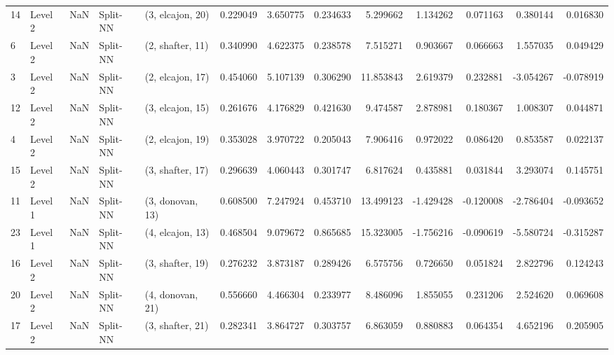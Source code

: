 \begin{tabular}{llrllrrrrrrrr}
14 &   Level 2 &    NaN &       Split-NN &  (3, elcajon, 20) &   0.229049 &   3.650775 &  0.234633 &   5.299662 &             1.134262 &               0.071163 &            0.380144 &              0.016830 \\
6  &   Level 2 &    NaN &       Split-NN &  (2, shafter, 11) &   0.340990 &   4.622375 &  0.238578 &   7.515271 &             0.903667 &               0.066663 &            1.557035 &              0.049429 \\
3  &   Level 2 &    NaN &       Split-NN &  (2, elcajon, 17) &   0.454060 &   5.107139 &  0.306290 &  11.853843 &             2.619379 &               0.232881 &           -3.054267 &             -0.078919 \\
12 &   Level 2 &    NaN &       Split-NN &  (3, elcajon, 15) &   0.261676 &   4.176829 &  0.421630 &   9.474587 &             2.878981 &               0.180367 &            1.008307 &              0.044871 \\
4  &   Level 2 &    NaN &       Split-NN &  (2, elcajon, 19) &   0.353028 &   3.970722 &  0.205043 &   7.906416 &             0.972022 &               0.086420 &            0.853587 &              0.022137 \\
15 &   Level 2 &    NaN &       Split-NN &  (3, shafter, 17) &   0.296639 &   4.060443 &  0.301747 &   6.817624 &             0.435881 &               0.031844 &            3.293074 &              0.145751 \\
11 &   Level 1 &    NaN &       Split-NN &  (3, donovan, 13) &   0.608500 &   7.247924 &  0.453710 &  13.499123 &            -1.429428 &              -0.120008 &           -2.786404 &             -0.093652 \\
23 &   Level 1 &    NaN &       Split-NN &  (4, elcajon, 13) &   0.468504 &   9.079672 &  0.865685 &  15.323005 &            -1.756216 &              -0.090619 &           -5.580724 &             -0.315287 \\
16 &   Level 2 &    NaN &       Split-NN &  (3, shafter, 19) &   0.276232 &   3.873187 &  0.289426 &   6.575756 &             0.726650 &               0.051824 &            2.822796 &              0.124243 \\
20 &   Level 2 &    NaN &       Split-NN &  (4, donovan, 21) &   0.556660 &   4.466304 &  0.233977 &   8.486096 &             1.855055 &               0.231206 &            2.524620 &              0.069608 \\
17 &   Level 2 &    NaN &       Split-NN &  (3, shafter, 21) &   0.282341 &   3.864727 &  0.303757 &   6.863059 &             0.880883 &               0.064354 &            4.652196 &              0.205905 \\

\end{tabular}
